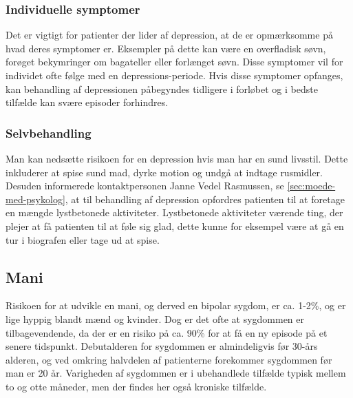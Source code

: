 \subsubsection{Individuelle symptomer}
Det er vigtigt for patienter der lider af depression, at de er opmærksomme på hvad deres symptomer er.
Eksempler på dette kan være en overfladisk søvn, forøget bekymringer om bagateller eller forlænget søvn.
Disse symptomer vil for individet ofte følge med en depressions-periode.
Hvis disse symptomer opfanges, kan behandling af depressionen påbegyndes tidligere i forløbet og i bedste tilfælde kan svære episoder forhindres.
\subsubsection{Selvbehandling}
Man kan nedsætte risikoen for en depression hvis man har en sund livsstil.
Dette inkluderer at spise sund mad, dyrke motion og undgå at indtage rusmidler.
Desuden informerede kontaktpersonen Janne Vedel Rasmussen, se \cref{sec:moede-med-psykolog}, at til behandling af depression opfordres patienten til at foretage en mængde lystbetonede aktiviteter.
Lystbetonede aktiviteter værende ting, der plejer at få patienten til at føle sig glad, dette kunne for eksempel være at gå en tur i biografen eller tage ud at spise. 

\subsection{Mani}
Risikoen for at udvikle en mani, og derved en bipolar sygdom, er ca. 1-2\%, og er lige hyppig blandt mænd og kvinder.
Dog er det ofte at sygdommen er tilbagevendende, da der er en risiko på ca. 90\% for at få en ny episode på et senere tidspunkt.
Debutalderen for sygdommen er almindeligvis før 30-års alderen, og ved omkring halvdelen af patienterne forekommer sygdommen før man er 20 år.
Varigheden af sygdommen er i ubehandlede tilfælde typisk mellem to og otte måneder, men der findes her også kroniske tilfælde.

